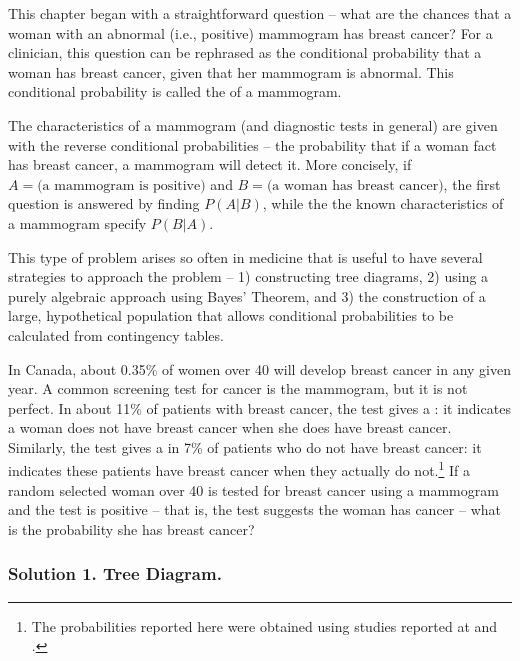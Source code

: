 
This chapter began with a straightforward question -- what are the chances that a woman with an abnormal (i.e., positive) mammogram has breast cancer?  For a clinician, this question can be rephrased as the conditional probability  that a woman has breast cancer, given that her mammogram is abnormal. This conditional probability is called the  of a mammogram.  

The characteristics of a mammogram (and diagnostic tests in general) are given with the reverse conditional probabilities --  the probability that if a woman fact has breast cancer, a mammogram will detect it.  More concisely, if $A = \text{(a mammogram is  positive)}$ and $B = \text{(a woman has breast cancer)}$, the first question is answered by finding $P(A|B)$, while the the known characteristics of a mammogram specify $P(B|A)$.

This type of problem arises so often in medicine that is useful to have several strategies to approach the problem -- 1) constructing tree diagrams, 2) using a purely algebraic approach using Bayes' Theorem, and 3) the construction of a large, hypothetical population that allows conditional probabilities to be calculated from contingency tables.

\begin{example}{In Canada, about 0.35\% of women over 40 will develop breast cancer in any given year. A common screening test for cancer is the mammogram, but it is not perfect. In about 11\% of patients with breast cancer, the test gives a : it indicates a woman does not have breast cancer when she does have breast cancer. Similarly, the test gives a  in 7\% of patients who do not have breast cancer: it indicates these patients have breast cancer when they actually do not.\footnote{The probabilities reported here were obtained using studies reported at  and .} If a random selected woman over 40 is tested for breast cancer using a mammogram and the test is positive -- that is, the test suggests the woman has cancer -- what is the probability she has breast cancer?}
\label{probabilityOfBreastCancerGivenPositiveTestExample}
\end{example}

\subsubsection{Solution 1. Tree Diagram.}

